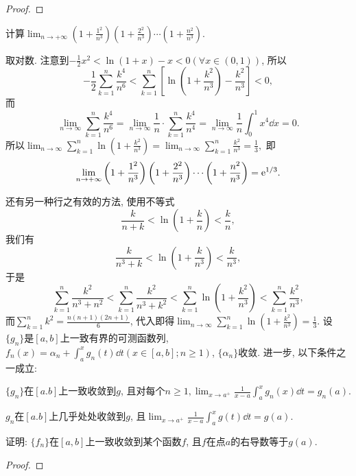 \begin{quiza}
\begin{proof}
\end{proof}
\woe 计算\(\lim_{n\rightarrow+\infty}\left(1+\frac{1^2}{n^3}\right)\left(1+\frac{2^2}{n^3}\right)\cdots\left(1+\frac{n^2}{n^3}\right).\)
\begin{solution}
取对数. 注意到\(-\frac{1}{2}x^2<\ln(1+x)-x<0(\forall x\in (0,1))\), 所以\[-\frac{1}{2}\sum_{k=1}^{n}\frac{k^4}{n^6}<\sum_{k=1}^{n}\left[\ln\left(1+\frac{k^2}{n^3}\right)-\frac{k^2}{n^3}\right]<0,\]而\[\lim_{n\rightarrow\infty}\sum_{k=1}^{n}\frac{k^4}{n^6}=\lim_{n\rightarrow\infty}\frac{1}{n}\cdot\sum_{k=1}^{n}\frac{k^4}{n^4}=\lim_{n\rightarrow\infty}\frac{1}{n}\int_{0}^{1}x^4\dd x=0.\]所以\(\lim_{n\rightarrow\infty}\sum_{k=1}^{n}\ln\left(1+\frac{k^2}{n^3}\right)=\lim_{n\rightarrow\infty}\sum_{k=1}^{n}\frac{k^2}{n^3}=\frac{1}{3},\) 即\[\lim_{n\rightarrow+\infty}\left(1+\frac{1^2}{n^3}\right)\left(1+\frac{2^2}{n^3}\right)\cdots\left(1+\frac{n^2}{n^3}\right)=\mathrm{e}^{1/3}.\qedhere\]
\end{solution}
\tcbline
还有另一种行之有效的方法, 使用不等式\[\frac{k}{n+k}<\ln\left(1+\frac{k}{n}\right)<\frac{k}{n},\]我们有\[\frac{k}{n^3+k}<\ln\left(1+\frac{k}{n^3}\right)<\frac{k}{n^3},\]于是\[\sum_{k=1}^{n}\frac{k^2}{n^3+n^2}<\sum_{k=1}^{n}\frac{k^2}{n^3+k^2}<\sum_{k=1}^{n}\ln\left(1+\frac{k^2}{n^3}\right)<\sum_{k=1}^{n}\frac{k^2}{n^3},\]而\(\sum_{k=1}^{n}k^2=\frac{n(n+1)(2n+1)}{6}\), 代入即得\(\lim_{n\rightarrow\infty}\sum_{k=1}^{n}\ln\left(1+\frac{k^2}{n^3}\right)=\frac{1}{3}\).
\woe 设\(\{g_n\}\)是\([a,b]\)上一致有界的可测函数列, \(f_n(x)=\alpha_n+\int_{a}^{x}g_n(t)\dd t(x\in [a,b];n\geqslant 1)\), \(\{\alpha_n\}\)收敛. 进一步, 以下条件之一成立:
\begin{compactenum}[(i)]
\item \(\{g_n\}\)在\([a.b]\)上一致收敛到\(g\), 且对每个\(n\geqslant 1,\lim_{x\rightarrow a^+}\frac{1}{x-a}\int_{a}^{x}g_n(x)\dd t=g_n(a)\).
\item \(g_n\)在\([a.b]\)上几乎处处收敛到\(g\), 且\(\lim_{x\rightarrow a^+}\frac{1}{x-a}\int_{a}^{x}g(t)\dd t=g(a)\).
\end{compactenum}
证明: \(\{f_n\}\)在\([a,b]\)上一致收敛到某个函数\(f\), 且\(f\)在点\(a\)的右导数等于\(g(a)\).
\begin{proof}

\end{proof}
\end{quiza}
